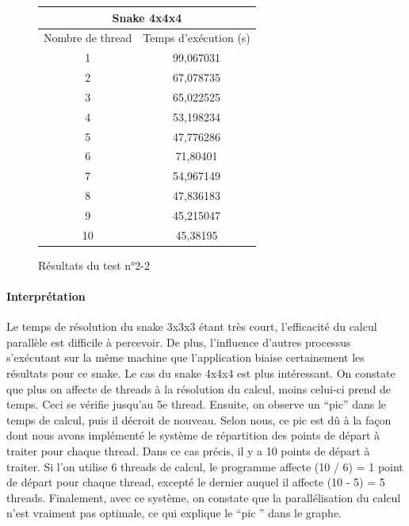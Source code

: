 \begin{figure}[h]
\begin{center}
\begin{tabular}{|*{2}{c|}}
\hline
\multicolumn{2}{|c|}{Snake 4x4x4} \\
\hline
Nombre de thread & Temps d’exécution (s) \\
\hline
1 & 99,067031 \\
\hline
2 & 67,078735 \\
\hline
3 & 65,022525 \\
\hline
4 & 53,198234 \\
\hline
5 & 47,776286 \\
\hline
6 & 71,80401 \\
\hline
7 & 54,967149 \\
\hline
8 & 47,836183 \\
\hline
9 & 45,215047 \\
\hline
10 & 45,38195 \\
\hline
\end{tabular}
\end{center}
\caption{Résultats du test n°2-2}
\end{figure}

\newpage

\paragraph{Interprétation} Le temps de résolution du snake 3x3x3 étant très court, l'efficacité du calcul parallèle est difficile à percevoir. De plus, l'influence d'autres processus s'exécutant sur la même machine que l'application biaise certainement les résultats pour ce snake. Le cas du snake 4x4x4 est plus intéressant. On constate que plus on affecte de threads à la résolution du calcul, moins celui-ci prend de temps. Ceci se vérifie jusqu'au 5e thread. Ensuite, on observe un ``pic'' dans le temps de calcul, puis il décroit de nouveau. Selon nous, ce pic est dû à la façon dont nous avons implémenté le système de répartition des points de départ à traiter pour chaque thread. Dans ce cas précis, il y a 10 points de départ à traiter. Si l'on utilise 6 threads de calcul, le programme affecte (10 / 6) = 1 point de départ pour chaque thread, excepté le dernier auquel il affecte (10 - 5) = 5 threads. Finalement, avec ce système, on constate que la parallélisation du calcul n'est vraiment pas optimale, ce qui explique le ``pic '' dans le graphe.

